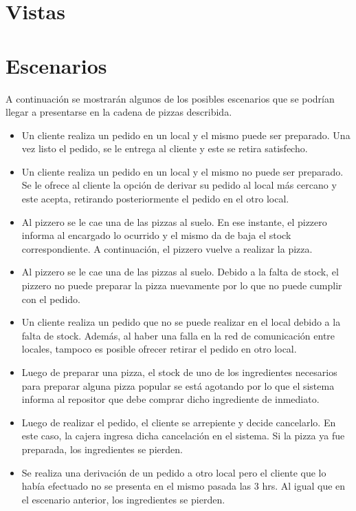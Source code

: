 \documentclass[a4paper,11pt] {article}
\begin{document}
\section*{Vistas}

\section*{Escenarios}
A continuaci\'on se mostrar\'an algunos de los posibles escenarios que se podr\'ian llegar a presentarse en la cadena de pizzas describida. 
\begin{itemize}
	\item Un cliente realiza un pedido en un local y el mismo puede ser preparado. Una vez listo el pedido, se le entrega al cliente y este se retira satisfecho.
	\item Un cliente realiza un pedido en un local y el mismo no puede ser preparado. Se le ofrece al cliente la opci\'on de derivar su pedido al local m\'as cercano y este acepta, retirando posteriormente el pedido en el otro local.
    \item Al pizzero se le cae una de las pizzas al suelo. En ese instante, el pizzero informa al encargado lo ocurrido y el mismo da de baja el stock correspondiente. A continuación, el pizzero vuelve a realizar la pizza.
    \item Al pizzero se le cae una de las pizzas al suelo. Debido a la falta de stock, el pizzero no puede preparar la pizza nuevamente por lo que no puede cumplir con el pedido.
    \item Un cliente realiza un pedido que no se puede realizar en el local debido a la falta de stock. Además, al haber una falla en la red de comunicación entre locales, tampoco es posible ofrecer retirar el pedido en otro local.
    \item Luego de preparar una pizza, el stock de uno de los ingredientes necesarios para preparar alguna pizza popular se está agotando por lo que el sistema informa al repositor que debe comprar dicho ingrediente de inmediato.
    \item Luego de realizar el pedido, el cliente se arrepiente y decide cancelarlo. En este caso, la cajera ingresa dicha cancelación en el sistema. Si la pizza ya fue preparada, los ingredientes se pierden.
    \item Se realiza una derivación de un pedido a otro local pero el cliente que lo había efectuado no se presenta en el mismo pasada las 3 hrs. Al igual que en el escenario anterior, los ingredientes se pierden.
\end{itemize}
\end{document}
